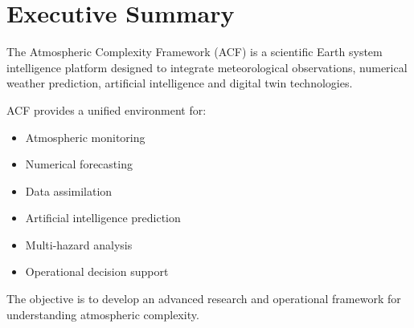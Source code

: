 \chapter*{Executive Summary}


The Atmospheric Complexity Framework (ACF) is a scientific
Earth system intelligence platform designed to integrate
meteorological observations, numerical weather prediction,
artificial intelligence and digital twin technologies.


ACF provides a unified environment for:

\begin{itemize}

\item Atmospheric monitoring

\item Numerical forecasting

\item Data assimilation

\item Artificial intelligence prediction

\item Multi-hazard analysis

\item Operational decision support

\end{itemize}


The objective is to develop an advanced research and operational
framework for understanding atmospheric complexity.
